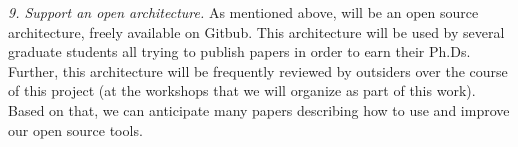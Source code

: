{\em 9. Support an open architecture.} As mentioned above, {\IT} will be an open
		source architecture, freely available on Gitbub. This architecture will be used by several graduate students all trying to publish papers in order to earn their Ph.Ds.
		Further, this architecture will be frequently reviewed by outsiders over the course of this project (at the workshops that we will organize as part of this work). Based on that, we can anticipate many papers describing how to use and improve our open source tools.

\ei
\vspace{8pt}
\newpage
 
